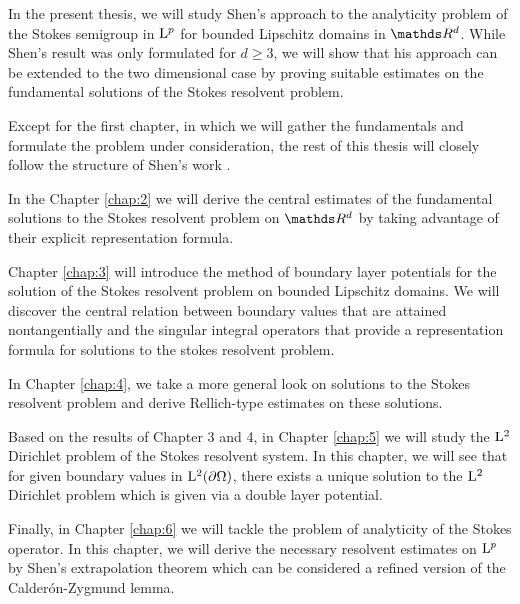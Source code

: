 In the present thesis, we will study Shen's approach to the analyticity problem of the Stokes semigroup in $\mathrm{L}^p$ for bounded Lipschitz domains in $\R^d$.
While Shen's result was only formulated for $d \geq 3$, we will show that his approach can be extended to the two dimensional case by proving suitable estimates on the fundamental solutions of the Stokes resolvent problem.

Except for the first chapter, in which we will gather the fundamentals and formulate the problem under consideration, the rest of this thesis will closely follow the structure of Shen's work \cite{Shen2012}. 

In the Chapter \ref{chap:2} we will derive the central estimates of the fundamental solutions to the Stokes resolvent problem on $\R^d$ by taking advantage of their explicit representation formula.

Chapter \ref{chap:3} will introduce the method of boundary layer potentials for the solution of the Stokes resolvent problem on bounded Lipschitz domains.
We will discover the central relation between boundary values that are attained nontangentially and the singular integral operators that provide a representation formula for solutions to the stokes resolvent problem. 

In Chapter \ref{chap:4}, we take a more general look on solutions to the Stokes resolvent problem and derive Rellich-type estimates on these solutions.

Based on the results of Chapter 3 and 4, in Chapter \ref{chap:5} we will study the $\mathrm{L}^2$ Dirichlet problem of the Stokes resolvent system. In this chapter, we will see that for given boundary values in $\mathrm{L}^2(\partial\Omega)$, there exists a unique solution to the $\mathrm{L}^2$ Dirichlet problem which is given via a double layer potential.

Finally, in Chapter \ref{chap:6} we will tackle the problem of analyticity of the Stokes operator. In this chapter, we will derive the necessary resolvent estimates on $\mathrm{L}^p$ by Shen's extrapolation theorem which can be considered a refined version of the Calder\'on-Zygmund lemma.




